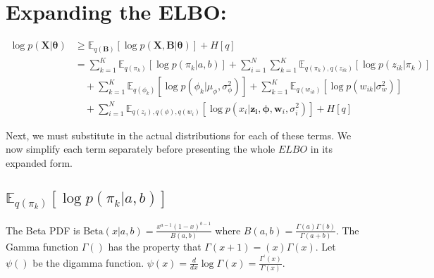 \documentclass[11pt]{article}
\theoremstyle{definition}
\theoremstyle{plain}
\newcommand{\E}{\mathbb{E}}
\newcommand{\Beta}{\text{Beta}}
\begin{document}
\section{Expanding the ELBO:}

\begin{align*}
    \log p (\mathbf{X}|\boldsymbol{\theta}) &\geq \E_{q(\mathbf{B})}[\log p(\mathbf{X,B} | \boldsymbol{\theta})] + H[q]\\
                                       &= \sum_{k=1}^K \E_{q(\pi_k)}[\log p(\pi_k|a,b)] 
    + \sum_{i=1}^N \sum_{k=1}^K \E_{q(\pi_k),q(z_{ik})}[\log p(z_{ik}|\pi_k)]\\
    &\quad + \sum_{k=1}^K \E_{q(\phi_k)}[\log p(\phi_k|\mu_{\phi},\sigma^2_\phi)] + \sum_{k=1}^K \E_{q(w_{ik})}[ \log p(w_{ik}|\sigma^2_w)]\\
    &\quad + \sum_{i=1}^N \E_{q(z_i),q(\phi),q(w_i)}[\log p(x_i | \mathbf{z_i}, \boldsymbol{\phi}, \mathbf{w}_i, \sigma^2_i)] + H[q]
\end{align*}

\noindent Next, we must substitute in the actual distributions for each of these terms.
We now simplify each term separately before presenting the whole $ELBO$ in its expanded form.

\subsection{$\E_{q(\pi_k)}[\log p(\pi_k|a,b)]$}

\noindent The Beta PDF is $\Beta(x|a,b) = \frac{x^{a-1}(1-x)^{b-1}}{B(a,b)}$ 
where $B(a,b) = \frac{\Gamma(a)\Gamma(b)}{\Gamma(a+b)}$. The Gamma function $\Gamma()$
has the property that $\Gamma(x+1) =  (x)\Gamma(x)$. Let $\psi()$ be the digamma function.
$\psi(x) = \frac{d}{dx} \log \Gamma(x) = \frac{\Gamma^\prime(x)}{\Gamma(x)}$. 


%

\end{document}
